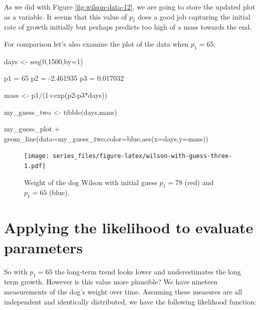 \documentclass[
]{book}
\newenvironment{Shaded}{\begin{snugshade}}{\end{snugshade}}
\newcommand{\AttributeTok}[1]{\textcolor[rgb]{0.77,0.63,0.00}{#1}}
\newcommand{\DecValTok}[1]{\textcolor[rgb]{0.00,0.00,0.81}{#1}}
\newcommand{\FloatTok}[1]{\textcolor[rgb]{0.00,0.00,0.81}{#1}}
\newcommand{\FunctionTok}[1]{\textcolor[rgb]{0.00,0.00,0.00}{#1}}
\newcommand{\NormalTok}[1]{#1}
\newcommand{\OtherTok}[1]{\textcolor[rgb]{0.56,0.35,0.01}{#1}}
\newcommand{\SpecialCharTok}[1]{\textcolor[rgb]{0.00,0.00,0.00}{#1}}
\newcommand{\StringTok}[1]{\textcolor[rgb]{0.31,0.60,0.02}{#1}}
\theoremstyle{definition}
\theoremstyle{definition}
\theoremstyle{definition}
\theoremstyle{remark}
\begin{document}
As we did with Figure \ref{fig:wilson-data-12}, we are going to store the updated plot as a variable. It seems that this value of \(p_{1}\) does a good job capturing the initial rate of growth initially but perhaps predicts too high of a mass towards the end.

For comparison let's also examine the plot of the data when \(p_{1}=65\):

\begin{Shaded}
\begin{Highlighting}[]
\NormalTok{days }\OtherTok{\textless{}{-}} \FunctionTok{seq}\NormalTok{(}\DecValTok{0}\NormalTok{,}\DecValTok{1500}\NormalTok{,}\AttributeTok{by=}\DecValTok{1}\NormalTok{)}

\NormalTok{  p1 }\OtherTok{=} \DecValTok{65}
\NormalTok{  p2 }\OtherTok{=} \SpecialCharTok{{-}}\FloatTok{2.461935}
\NormalTok{  p3 }\OtherTok{=} \FloatTok{0.017032}

\NormalTok{  mass }\OtherTok{\textless{}{-}}\NormalTok{  p1}\SpecialCharTok{/}\NormalTok{(}\DecValTok{1}\SpecialCharTok{+}\FunctionTok{exp}\NormalTok{(p2}\SpecialCharTok{{-}}\NormalTok{p3}\SpecialCharTok{*}\NormalTok{days))}

\NormalTok{my\_guess\_two }\OtherTok{\textless{}{-}} \FunctionTok{tibble}\NormalTok{(days,mass)}

\NormalTok{my\_guess\_plot }\SpecialCharTok{+}
  \FunctionTok{geom\_line}\NormalTok{(}\AttributeTok{data=}\NormalTok{my\_guess\_two,}\AttributeTok{color=}\StringTok{\textquotesingle{}blue\textquotesingle{}}\NormalTok{,}\FunctionTok{aes}\NormalTok{(}\AttributeTok{x=}\NormalTok{days,}\AttributeTok{y=}\NormalTok{mass))}
\end{Highlighting}
\end{Shaded}

\begin{figure}
\centering
\texttt{[image: series\_files/figure-latex/wilson-with-guess-three-1.pdf]}
\caption{\label{fig:wilson-with-guess-three}Weight of the dog Wilson with initial guess \(p_{1}=78\) (red) and \(p_{1}=65\) (blue).}
\end{figure}

\hypertarget{applying-the-likelihood-to-evaluate-parameters}{%
\section{Applying the likelihood to evaluate parameters}\label{applying-the-likelihood-to-evaluate-parameters}}

So with \(p_{1}=65\) the long-term trend looks lower and underestimates the long term growth. However is this value more plausible? We have nineteen measurements of the dog's weight over time. Assuming these measures are all independent and identically distributed, we have the following likelihood function:
\end{document}
